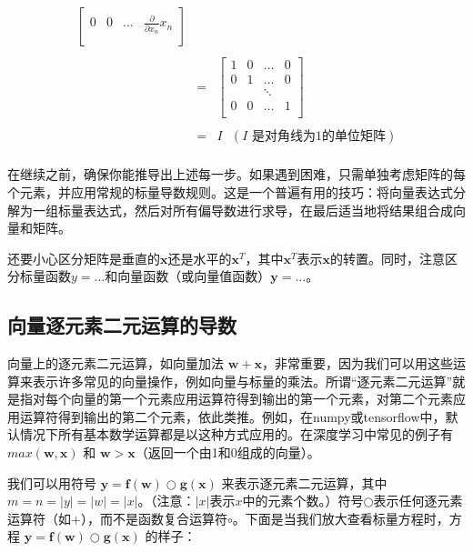 \documentclass[11pt]{article}
\begin{document}
\begin{center}
\begin{eqnarray*}
\begin{bmatrix}
	0 & 0 &\ldots& \frac{\partial}{\partial {x_n}} x_n \\
	\end{bmatrix}\\\\
	 & = & \begin{bmatrix}
	1 & 0 & \ldots& 0 \\
	0 &1 &\ldots & 0 \\
	& & \ddots\\
	0 & 0 & \ldots &1 \\
	\end{bmatrix}\\\\
	& = & I ~~~(I \text{ 是对角线为1的单位矩阵})\\
	\end{eqnarray*}

\end{center}

在继续之前，确保你能推导出上述每一步。如果遇到困难，只需单独考虑矩阵的每个元素，并应用常规的标量导数规则。这是一个普遍有用的技巧：将向量表达式分解为一组标量表达式，然后对所有偏导数进行求导，在最后适当地将结果组合成向量和矩阵。

还要小心区分矩阵是垂直的$\mathbf{x}$还是水平的$\mathbf{x}^T$，其中$\mathbf{x}^T$表示$\mathbf{x}$的转置。同时，注意区分标量函数$y = ...$和向量函数（或向量值函数）$\mathbf{y} = ...$。

\subsection{向量逐元素二元运算的导数}\label{sec4.2}

向量上的逐元素二元运算，如向量加法 $\mathbf{w} + \mathbf{x}$，非常重要，因为我们可以用这些运算来表示许多常见的向量操作，例如向量与标量的乘法。所谓“逐元素二元运算”就是指对每个向量的第一个元素应用运算符得到输出的第一个元素，对第二个元素应用运算符得到输出的第二个元素，依此类推。例如，在numpy或tensorflow中，默认情况下所有基本数学运算都是以这种方式应用的。在深度学习中常见的例子有 $max(\mathbf{w},\mathbf{x})$ 和 $\mathbf{w} > \mathbf{x}$（返回一个由1和0组成的向量）。

我们可以用符号 $\mathbf{y} = \mathbf{f(w)} \bigcirc \mathbf{g(x)}$ 来表示逐元素二元运算，其中 $m=n=|y|=|w|=|x|$。（注意：$|x|$表示$x$中的元素个数。）符号$\bigcirc$表示任何逐元素运算符（如$+$），而不是函数复合运算符$\circ$。下面是当我们放大查看标量方程时，方程 $\mathbf{y} = \mathbf{f(w)} \bigcirc \mathbf{g(x)}$ 的样子：
\end{document}
